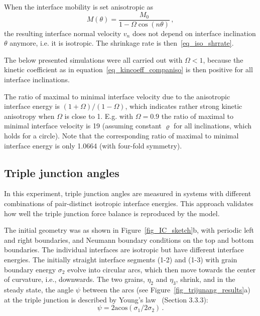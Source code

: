 When the interface mobility is set anisotropic as
\begin{equation} \label{eq_kincoeff_companiso}
	M(\theta) = \frac{M_0}{1-\Omega\cos(n\theta)} \,,
\end{equation}
the resulting interface normal velocity $v_n$ does not depend on interface inclination $\theta$ anymore, i.e. it is isotropic. The shrinkage rate is then~\eqref{eq_iso_shrrate}.

The below presented simulations were all carried out with $\Omega<1$, because the kinetic coefficient as in equation~\eqref{eq_kincoeff_companiso} is then positive for all interface inclinations. 

The ratio of maximal to minimal interface velocity due to the anisotropic interface energy is $(1+\Omega)/(1-\Omega)$, which indicates rather strong kinetic anisotropy when $\Omega$ is close to 1. E.g. with $\Omega=0.9$ the ratio of maximal to minimal interface velocity is 19 (assuming constant $\varrho$ for all inclinations, which holds for a circle). Note that the corresponding ratio of maximal to minimal interface energy is only 1.0664 (with four-fold symmetry).

\subsection{Triple junction angles}

In this experiment, triple junction angles are measured in systems with different combinations of pair-distinct isotropic interface energies. This approach validates how well the triple junction force balance is reproduced by the model.

The initial geometry was as shown in Figure~\ref{fig_IC_sketch}b, with periodic left and right boundaries, and Neumann boundary conditions on the top and bottom boundaries. The individual interfaces are isotropic but have different interface energies. The initially straight interface segments (1-2) and (1-3) with grain boundary energy $\sigma_2$ evolve into circular arcs, which then move towards the center of curvature, i.e., downwards. The two grains, $\eta_2$ and $\eta_3$, shrink, and in the steady state, the angle $\psi$ between the arcs (see Figure~\ref{fig_trijunang_results}a) at the triple junction is described by Young's law~\cite{Porter2009} (Section 3.3.3):
\begin{equation}
	\psi = 2\mathrm{acos}(\sigma_{1}/2\sigma_{2}) \,.
\end{equation}


